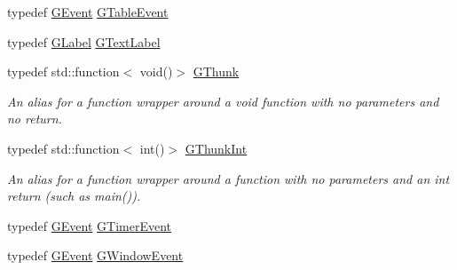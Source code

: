 \begin{DoxyCompactItemize}
\item 
typedef \mbox{\hyperlink{classsgl_1_1GEvent}{G\+Event}} \mbox{\hyperlink{namespacesgl_a515146871770e915a5b3857de61e84b7}{G\+Table\+Event}}
\item 
typedef \mbox{\hyperlink{classsgl_1_1GLabel}{G\+Label}} \mbox{\hyperlink{namespacesgl_a7240b4dda0f3120513f729a11318a45c}{G\+Text\+Label}}
\item 
typedef std\+::function$<$ void()$>$ \mbox{\hyperlink{namespacesgl_aa508400d1219d217e0e9509ff59a58f4}{G\+Thunk}}
\begin{DoxyCompactList}\small\item\em An alias for a function wrapper around a void function with no parameters and no return. \end{DoxyCompactList}\item 
typedef std\+::function$<$ int()$>$ \mbox{\hyperlink{namespacesgl_a2c46348e6e6dbf761bcceddb93945ac3}{G\+Thunk\+Int}}
\begin{DoxyCompactList}\small\item\em An alias for a function wrapper around a function with no parameters and an int return (such as main()). \end{DoxyCompactList}\item 
typedef \mbox{\hyperlink{classsgl_1_1GEvent}{G\+Event}} \mbox{\hyperlink{namespacesgl_a2ca0237e76a4d44e8805aed1d4aeb334}{G\+Timer\+Event}}
\item 
typedef \mbox{\hyperlink{classsgl_1_1GEvent}{G\+Event}} \mbox{\hyperlink{namespacesgl_a0b7adf9ace5e19350831f5002b7bd970}{G\+Window\+Event}}
\end{DoxyCompactItemize}
